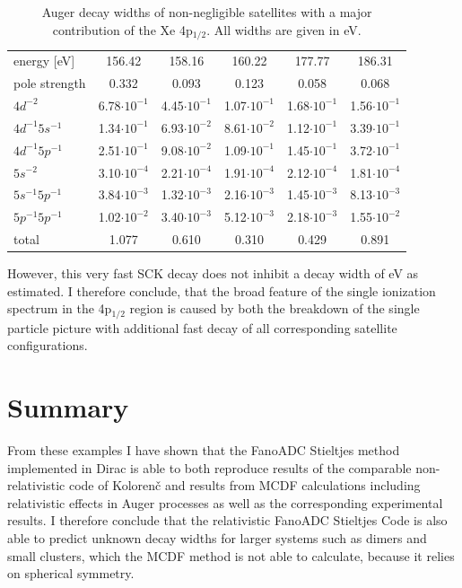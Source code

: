 \begin{table}[h]
 \centering
 \caption{Auger decay widths of non-negligible satellites with a major
          contribution of the Xe 4p$_{1/2}$. All widths are given in \unit{eV}.}
 \begin{tabular}{lccccc}
   \toprule
   energy [\unit{eV}] & 156.42  & 158.16 & 160.22 & 177.77 & 186.31\\
   pole strength       &   0.332 &   0.093&   0.123&   0.058&   0.068\\
   \midrule
   $4d^{-2}$          & 6.78$\cdot10^{-1}$ & 4.45$\cdot10^{-1}$ & 1.07$\cdot10^{-1}$ & 1.68$\cdot10^{-1}$ & 1.56$\cdot10^{-1}$\\
   $4d^{-1}5s^{-1}$   & 1.34$\cdot10^{-1}$ & 6.93$\cdot10^{-2}$ & 8.61$\cdot10^{-2}$ & 1.12$\cdot10^{-1}$ & 3.39$\cdot10^{-1}$\\
   $4d^{-1}5p^{-1}$   & 2.51$\cdot10^{-1}$ & 9.08$\cdot10^{-2}$ & 1.09$\cdot10^{-1}$ & 1.45$\cdot10^{-1}$ & 3.72$\cdot10^{-1}$\\
   $5s^{-2}$          & 3.10$\cdot10^{-4}$ & 2.21$\cdot10^{-4}$ & 1.91$\cdot10^{-4}$ & 2.12$\cdot10^{-4}$ & 1.81$\cdot10^{-4}$\\
   $5s^{-1}5p^{-1}$   & 3.84$\cdot10^{-3}$ & 1.32$\cdot10^{-3}$ & 2.16$\cdot10^{-3}$ & 1.45$\cdot10^{-3}$ & 8.13$\cdot10^{-3}$\\
   $5p^{-1}5p^{-1}$   & 1.02$\cdot10^{-2}$ & 3.40$\cdot10^{-3}$ & 5.12$\cdot10^{-3}$ & 2.18$\cdot10^{-3}$ & 1.55$\cdot10^{-2}$\\
   \midrule
   total              &   1.077 &   0.610&   0.310&   0.429&   0.891\\
   \bottomrule
 \end{tabular}
 \label{table:xe_auger_rel11}
\end{table}

However, this very fast \ac{SCK} decay does not inhibit a decay width of
\unit[10--100]{eV} as estimated\cite{}. I therefore conclude, that the broad
feature of the single ionization spectrum in the 4p$_{1/2}$ region is caused
by both the breakdown of the single particle picture with additional fast decay
of all corresponding satellite configurations.


\section{Summary}
From these examples I have shown that the FanoADC Stieltjes method implemented
in Dirac is able to both reproduce results of the comparable non-relativistic
code of Koloren\v{c}  and results from \ac{MCDF} calculations
including relativistic effects in Auger processes as well as the corresponding
experimental results.
I therefore conclude that the relativistic FanoADC Stieltjes Code is also able
to predict unknown decay widths for larger systems such as dimers and small
clusters, which the \ac{MCDF} method is not able to calculate, because it relies
on spherical symmetry.
